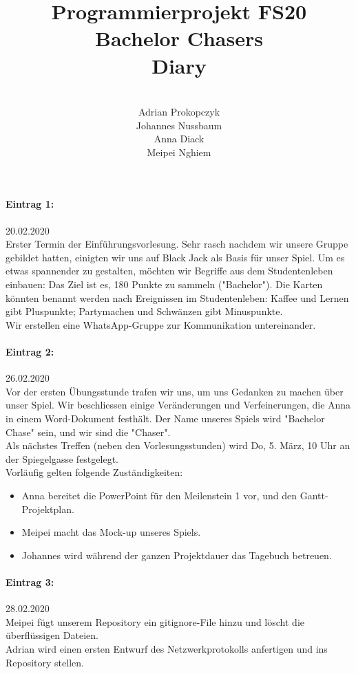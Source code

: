 \documentclass[12pt]{article}
\title{Programmierprojekt FS20\\Bachelor Chasers\\Diary}
\author{\\Adrian Prokopczyk\\Johannes Nussbaum\\Anna Diack\\Meipei Nghiem}
\date{}
\begin{document}
\begin{titlepage}

\maketitle
\thispagestyle{empty}
\setcounter{tocdepth}{2}

\end{titlepage}

\paragraph{Eintrag 1:}
20.02.2020 \\
Erster Termin der Einf\"uhrungsvorlesung. Sehr rasch nachdem wir unsere Gruppe gebildet hatten, einigten wir uns auf Black Jack als Basis für unser Spiel. Um es etwas spannender zu gestalten, m\"ochten wir Begriffe aus dem Studentenleben einbauen: Das Ziel ist es, 180 Punkte zu sammeln ("Bachelor"). Die Karten k\"onnten benannt werden nach Ereignissen im Studentenleben: Kaffee und Lernen gibt Pluspunkte; Partymachen und Schw\"anzen gibt Minuspunkte.\\
Wir erstellen eine WhatsApp-Gruppe zur Kommunikation untereinander.

\paragraph{Eintrag 2:}
26.02.2020\\
Vor der ersten \"Ubungsstunde trafen wir uns, um uns Gedanken zu machen \"uber unser Spiel. Wir beschliessen einige Veränderungen und Verfeinerungen, die Anna in einem Word-Dokument festh\"alt. Der Name unseres Spiels wird "Bachelor Chase" sein, und wir sind die "Chaser".\\
Als n\"achstes Treffen (neben den Vorlesungsstunden) wird Do, 5. M\"arz, 10 Uhr an der Spiegelgasse festgelegt.\\
Vorl\"aufig gelten folgende Zust\"andigkeiten:
\begin{itemize}
\item Anna bereitet die PowerPoint für den Meilenstein 1 vor, und den Gantt-Projektplan.
\item Meipei macht das Mock-up unseres Spiels.
\item Johannes wird während der ganzen Projektdauer das Tagebuch betreuen.
\end{itemize}

\paragraph{Eintrag 3:}
28.02.2020\\
Meipei fügt unserem Repository ein gitignore-File hinzu und löscht die überflüssigen Dateien.\\
Adrian wird einen ersten Entwurf des Netzwerkprotokolls anfertigen und ins Repository stellen.
\end{document}
